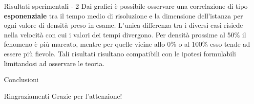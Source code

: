 \documentclass[a4paper]{beamer}
\begin{document}
\begin{frame}{Risultati sperimentali - 2}
Dai grafici è possibile osservare una correlazione di tipo \textbf{esponenziale} tra il tempo medio di risoluzione e la dimensione dell'istanza
per ogni valore di densità preso in esame.
\newline \newline
L'unica differenza tra i diversi casi risiede nella velocità con cui i valori dei tempi divergono. Per densità prossime al 50\% il fenomeno è più marcato, 
mentre per quelle vicine allo 0\% o al 100\% esso tende ad essere più fievole.
\newline \newline 
Tali risultati risultano compatibili con le ipotesi formulabili limitandosi ad osservare le teoria.
\end{frame}

\begin{frame}{Conclusioni}
	
\end{frame}

\begin{frame}{Ringraziamenti}
\centering
\LARGE Grazie per l'attenzione!
\end{frame}

\begin{frame}
\maketitle
\end{frame}
\end{document}
